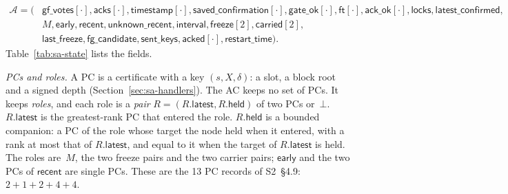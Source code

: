 \documentclass{article}
\newcommand{\AC}{\mathcal A}
\newcommand{\gfPool}{\mathsf{gf\_votes}}
\newcommand{\latestConfirmed}{\mathsf{latest\_confirmed}}
\newcommand{\timestamp}{\mathsf{timestamp}}
\newcommand{\savedConfirmation}{\mathsf{saved\_confirmation}}
\newcommand{\locks}{\mathsf{locks}}
\newcommand{\restartTime}{\mathsf{restart\_time}}
\newcommand{\acks}{\mathsf{acks}}
\newcommand{\acked}{\mathsf{acked}}
\begin{document}
\[
\begin{split}
 \AC=(&\gfPool[\cdot],\acks[\cdot],\timestamp[\cdot],
 \savedConfirmation[\cdot],\mathsf{gate\_ok}[\cdot],\mathsf{ft}[\cdot],
 \mathsf{ack\_ok}[\cdot],\locks,\latestConfirmed,\\
 &M,\mathsf{early},\mathsf{recent},\mathsf{unknown\_recent},
 \mathsf{interval},\mathsf{freeze}[2],\mathsf{carried}[2],\\
 &\mathsf{last\_freeze},\mathsf{fg\_candidate},\mathsf{sent\_keys},\acked[\cdot],\restartTime).
\end{split}
\]
Table~\ref{tab:sa-state} lists the fields.

\emph{PCs and roles.}  A PC is a certificate with a key
$(s,X,\delta)$: a slot, a block root and a signed depth
(Section~\ref{sec:sa-handlers}).  The AC keeps no set of PCs.  It keeps
\emph{roles}, and each role is a \emph{pair} $R=(R.\mathsf{latest},
R.\mathsf{held})$ of two PCs or~$\bot$.  $R.\mathsf{latest}$ is the
greatest-rank PC that entered the role.  $R.\mathsf{held}$ is a bounded
companion: a PC of the role whose target the node held when it entered,
with a rank at most that of $R.\mathsf{latest}$, and equal to it when the
target of $R.\mathsf{latest}$ is held.  The roles are~$M$, the two freeze
pairs and the two carrier pairs; $\mathsf{early}$ and the two PCs of
$\mathsf{recent}$ are single PCs.  These are the 13 PC records of
S2~\S4.9: $2+1+2+4+4$.
\end{document}
